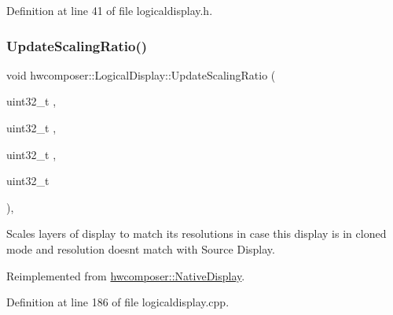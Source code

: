 Definition at line 41 of file logicaldisplay.\+h.


\begin{DoxyCode}{0}
\end{DoxyCode}
\mbox{\label{classhwcomposer_1_1LogicalDisplay_ad4813941543f9765790888d7e7c6865f}} 
\subsubsection{\texorpdfstring{Update\+Scaling\+Ratio()}{UpdateScalingRatio()}}
{\footnotesize\ttfamily void hwcomposer\+::\+Logical\+Display\+::\+Update\+Scaling\+Ratio (\begin{DoxyParamCaption}\item[{uint32\+\_\+t}]{,  }\item[{uint32\+\_\+t}]{,  }\item[{uint32\+\_\+t}]{,  }\item[{uint32\+\_\+t}]{ }\end{DoxyParamCaption})\hspace{0.3cm}{\ttfamily [override]}, {\ttfamily [virtual]}}

Scales layers of display to match it\textquotesingle{}s resolutions in case this display is in cloned mode and resolution doesn\textquotesingle{}t match with Source Display. 

Reimplemented from \mbox{\hyperlink{classhwcomposer_1_1NativeDisplay_abfad592c2a5e956760c194fa7831171c}{hwcomposer\+::\+Native\+Display}}.



Definition at line 186 of file logicaldisplay.\+cpp.


\begin{DoxyCode}{0}
\end{DoxyCode}
\mbox{\label{classhwcomposer_1_1LogicalDisplay_adfb3b051b8636f58226bc30da8fe1735}} 
